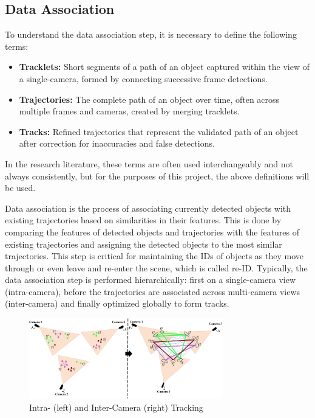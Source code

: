 \subsection{Data Association}\label{subsec:data_association}
To understand the data association step, it is necessary to define the following terms:

\begin{itemize}
    \item \textbf{Tracklets:} Short segments of a path of an object captured within the view of a single-camera, formed by connecting successive frame detections.
    \item \textbf{Trajectories:} The complete path of an object over time, often across multiple frames and cameras, created by merging tracklets.
    \item \textbf{Tracks:} Refined trajectories that represent the validated path of an object after correction for inaccuracies and false detections.
\end{itemize}

In the research literature, these terms are often used interchangeably and not always consistently, but for the purposes of this project, the above definitions will be used.

Data association is the process of associating currently detected objects with existing trajectories based on similarities in their features. This is done by comparing the features of detected objects and trajectories with the features of existing trajectories and assigning the detected objects to the most similar trajectories. This step is critical for maintaining the IDs of objects as they move through or even leave and re-enter the scene, which is called re-ID. Typically, the data association step is performed hierarchically: first on a single-camera view (intra-camera), before the trajectories are associated across multi-camera views (inter-camera) and finally optimized globally to form tracks.

\begin{figure}[ht]
    \centering
    \includegraphics[width=0.75\textwidth]{resources/fig/Tesfaye19-intra_inter_camera_tracking.png}
    \caption[Intra- and Inter-Camera Tracking]{Intra- (left) and Inter-Camera (right) Tracking~\cite[source image:][Fig.~1]{Tesfaye19}}\label{fig:intra_inter_camera_tracking}
\end{figure}

